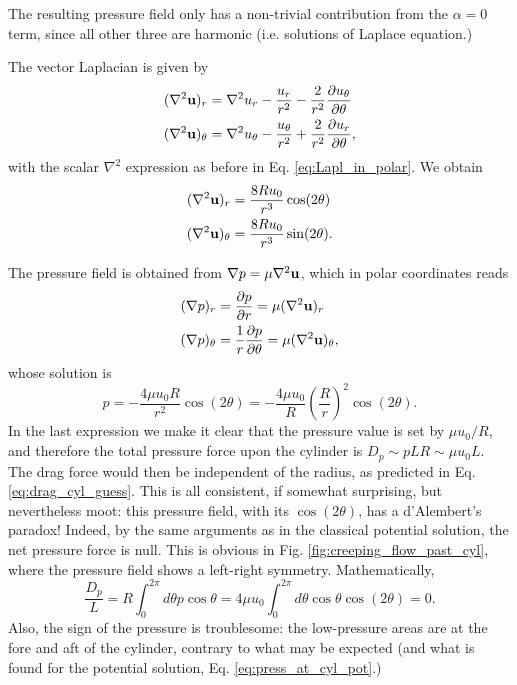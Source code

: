 The resulting pressure field only has a non-trivial contribution from
the $\alpha=0$ term, since all other three are harmonic
(i.e. solutions of Laplace equation.)

The vector Laplacian is given by
\begin{align*}
(\nabla^2\mathbf{u})_r &= \nabla^2 u_r - \frac{u_r}{r^2} - \frac{2}{r^2}
           \frac{\partial u_\theta}{\partial \theta} \\
(\nabla^2\mathbf{u})_\theta &= \nabla^2 u_\theta - \frac{u_\theta}{r^2} + \frac{2}{r^2}
           \frac{\partial u_r}{\partial \theta} ,  
\end{align*}
with the scalar $\nabla^2$ expression as before in Eq.
\ref{eq:Lapl_in_polar}. We obtain
\begin{align*}
  (\nabla^2\mathbf{u})_r &=   \frac{8 R u_0}{r^3} \cos(2 \theta)  \\
  (\nabla^2\mathbf{u})_\theta &=    \frac{8 R u_0}{r^3} \sin(2 \theta)   .
\end{align*}

The pressure field is obtained from $\nabla p = \mu \nabla^2 \mathbf{u}$,
which in polar coordinates reads
\begin{align*}
  (\nabla p)_r     &=               \frac{\partial p }{  \partial r } = \mu(\nabla^2\mathbf{u})_r  \\
  (\nabla p)_\theta &=  \frac{1}{r} \frac{\partial p }{  \partial \theta } = \mu(\nabla^2\mathbf{u})_\theta ,
\end{align*}
whose solution is
\[
  p =
  -\frac{4 \mu u_0 R }{r^2} \cos(2\theta) =
  -\frac{4 \mu u_0}{R} \left( \frac{R }{r} \right)^2 \cos(2\theta) .
\]
In the last expression we make it clear that the pressure value is set
by $\mu u_0 / R$, and therefore the total pressure force upon the
cylinder is $D_p \sim p L R \sim \mu u_0 L$. The drag force would then
be independent of the radius, as predicted in
Eq. \ref{eq:drag_cyl_guess}. This is all consistent, if somewhat
surprising, but nevertheless moot: this pressure field, with its
$\cos(2\theta)$, has a d'Alembert's paradox! Indeed, by the same
arguments as in the classical potential solution, the net pressure
force is null. This is obvious in
Fig. \ref{fig:creeping_flow_past_cyl}, where the pressure field shows
a left-right symmetry.  Mathematically,
\begin{equation}
  \label{eq:pressure_drag_on_cyl_creeping}
  \frac{  D_p }{L} =
    R \int_0^{2\pi} d\theta   p \cos\theta  =
    4 \mu u_0 \int_0^{2\pi} d\theta  \cos\theta  \cos(2\theta)  = 0.
\end{equation}
Also, the sign of the pressure is troublesome: the low-pressure areas
are at the fore and aft of the cylinder, contrary to what may be
expected (and what is found for the potential solution,
Eq. \ref{eq:press_at_cyl_pot}.)

